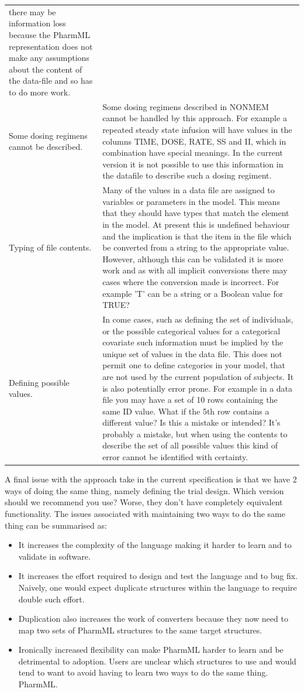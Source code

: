 \documentclass[a4paper,10pt]{article}
\newcommand{\pharmml}{PharmML\xspace}
\begin{document}
{\begin{longtable}{p{5cm} p{10cm}}
  there may be information loss because the \pharmml representation does
  not make any assumptions about the content of the data-file and so
  has to do more work.\\
  Some dosing regimens cannot be described. &  Some dosing regimens
  described in NONMEM cannot be handled by this approach. For example
  a repeated steady state infusion will have values in the
  columns TIME, DOSE, RATE, SS and II, which in combination have
  special meanings. In the current version it is not possible to use this information in the
  datafile to describe such a dosing regiment.\\
Typing of file contents. & Many of the values in a data file are
assigned to variables or parameters in the model. This means that they
should have types that match the element in the model. At present this
is undefined behaviour and the implication is that the item in the
file which be converted from a string to the appropriate
value. However, although this can be validated it is more work and as
with all implicit conversions there may cases where the conversion
made is incorrect. For example 'T' can be a string or a Boolean value for TRUE?\\
Defining possible values. & In come cases, such as defining the set of
individuals, or the possible categorical values for a categorical
covariate such information must be implied by the unique set of values
in the data file. This does not permit one to define categories in
your model, that are not used by the current population of
subjects. It is also potentially error prone. For example in a data
file you may have a set of 10 rows containing the same ID value. What
if the 5th row contains a different value? Is this a mistake or
intended? It's probably a mistake, but when using the contents to
describe the set of all possible values this kind of error cannot be
identified with certainty.\\
\bottomrule
\end{longtable}%
}
%
A final issue with the approach take in the current specification is
that we have 2 ways of doing the same thing, namely defining the trial
design. Which version should we recommend you use? Worse, they don't
have completely equivalent functionality. The issues associated with
maintaining two ways to do the same thing can be summarised as:
\begin{itemize}
\item It increases the complexity of the language making it harder to
  learn and to validate in software.
\item It increases the effort required to design and test the
  language and to bug fix. Naively, one would expect duplicate structures within the
  language to require double such effort.
\item Duplication also increases the work of converters because they
  now need to map two sets of \pharmml structures to the same target structures.
\item Ironically increased flexibility can make \pharmml harder to
  learn and be detrimental to adoption. Users are unclear which
  structures to use and would tend to want to avoid having to learn
  two ways to do the same thing.
\pharmml. 
\end{itemize}
\end{document}
